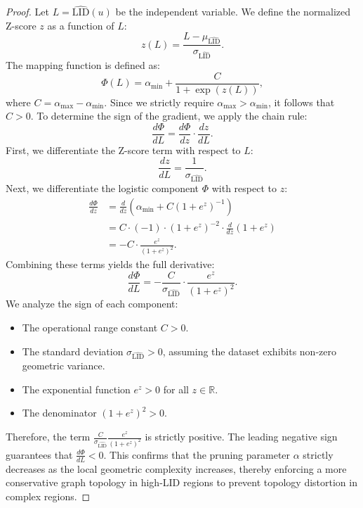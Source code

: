 \documentclass{article}
\theoremstyle{plain}
\theoremstyle{definition}
\theoremstyle{remark}
\begin{document}
\begin{proof}
Let $L = \widehat{\text{LID}}(u)$ be the independent variable. We define the normalized Z-score $z$ as a function of $L$:
\begin{equation}
    z(L) = \frac{L - \mu_{\widehat{\text{LID}}}}{\sigma_{\widehat{\text{LID}}}}.
\end{equation}
The mapping function is defined as:
\begin{equation}
    \Phi(L) = \alpha_{\min} + \frac{C}{1 + \exp(z(L))},
\end{equation}
where $C = \alpha_{\max} - \alpha_{\min}$. Since we strictly require $\alpha_{\max} > \alpha_{\min}$, it follows that $C > 0$.
To determine the sign of the gradient, we apply the chain rule:
\begin{equation}
    \frac{d \Phi}{d L} = \frac{d \Phi}{d z} \cdot \frac{d z}{d L}.
\end{equation}
First, we differentiate the Z-score term with respect to $L$:
\begin{equation}
    \frac{d z}{d L} = \frac{1}{\sigma_{\widehat{\text{LID}}}}.
\end{equation}
Next, we differentiate the logistic component $\Phi$ with respect to $z$:
\begin{align}
    \frac{d \Phi}{d z} &= \frac{d}{d z} \left( \alpha_{\min} + C (1 + e^z)^{-1} \right) \\
    &= C \cdot (-1) \cdot (1 + e^z)^{-2} \cdot \frac{d}{d z}(1 + e^z) \\
    &= - C \cdot \frac{e^z}{(1 + e^z)^2}.
\end{align}
Combining these terms yields the full derivative:
\begin{equation}
    \frac{d \Phi}{d L} = - \frac{C}{\sigma_{\widehat{\text{LID}}}} \cdot \frac{e^z}{(1 + e^z)^2}.
\end{equation}
We analyze the sign of each component:
\begin{itemize}
    \item The operational range constant $C > 0$.
    \item The standard deviation $\sigma_{\widehat{\text{LID}}} > 0$, assuming the dataset exhibits non-zero geometric variance.
    \item The exponential function $e^z > 0$ for all $z \in \mathbb{R}$.
    \item The denominator $(1 + e^z)^2 > 0$.
\end{itemize}
Therefore, the term $\frac{C}{\sigma_{\widehat{\text{LID}}}} \frac{e^z}{(1 + e^z)^2}$ is strictly positive. The leading negative sign guarantees that $\frac{d \Phi}{d L} < 0$.
This confirms that the pruning parameter $\alpha$ strictly decreases as the local geometric complexity increases, thereby enforcing a more conservative graph topology in high-LID regions to prevent topology distortion in complex regions.
\end{proof}
\end{document}
